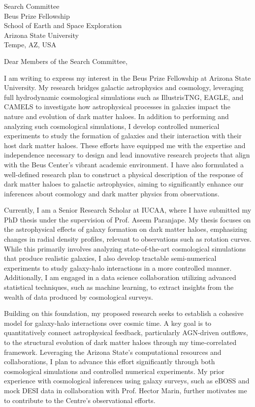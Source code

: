 \documentclass[11pt]{letter}
\begin{document}
\begin{letter}{Search Committee \\ Beus Prize Fellowship \\ School of Earth and Space Exploration \\ Arizona State University \\ Tempe, AZ, USA}

\opening{Dear Members of the Search Committee,}

I am writing to express my interest in the Beus Prize Fellowship at Arizona State University. My research bridges galactic astrophysics and cosmology, leveraging full hydrodynamic cosmological simulations such as IllustrisTNG, EAGLE, and CAMELS to investigate how astrophysical processes in galaxies impact the nature and evolution of dark matter haloes. In addition to performing and analyzing such cosmological simulations, I develop controlled numerical experiments to study the formation of galaxies and their interaction with their host dark matter haloes. These efforts have equipped me with the expertise and independence necessary to design and lead innovative research projects that align with the Beus Center's vibrant academic environment. I have also formulated a well-defined research plan to construct a physical description of the response of dark matter haloes to galactic astrophysics, aiming to significantly enhance our inferences about cosmology and dark matter physics from observations.

Currently, I am a Senior Research Scholar at IUCAA, where I have submitted my PhD thesis under the supervision of Prof. Aseem Paranjape. My thesis focuses on the astrophysical effects of galaxy formation on dark matter haloes, emphasizing changes in radial density profiles, relevant to observations such as rotation curves. While this primarily involves analyzing state-of-the-art cosmological simulations that produce realistic galaxies, I also develop tractable semi-numerical experiments to study galaxy-halo interactions in a more controlled manner. Additionally, I am engaged in a data science collaboration utilizing advanced statistical techniques, such as machine learning, to extract insights from the wealth of data produced by cosmological surveys.

Building on this foundation, my proposed research seeks to establish a cohesive model for galaxy-halo interactions over cosmic time. A key goal is to quantitatively connect astrophysical feedback, particularly AGN-driven outflows, to the structural evolution of dark matter haloes through my time-correlated framework. Leveraging the Arizona State's computational resources and collaborations, I plan to advance this effort significantly through both cosmological simulations and controlled numerical experiments. My prior experience with cosmological inferences using galaxy surveys, such as eBOSS and mock DESI data in collaboration with Prof. Hector Marin, further motivates me to contribute to the Centre's observational efforts.


\end{letter}
\end{document}
